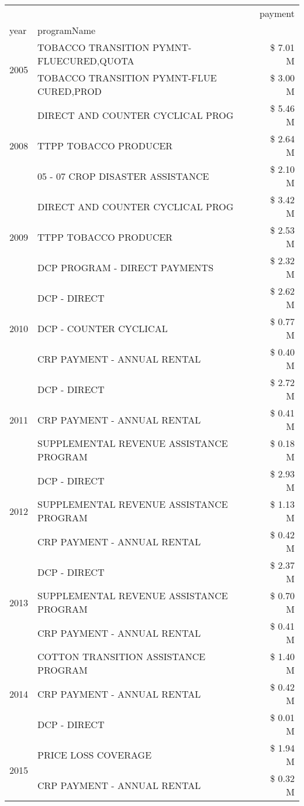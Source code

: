 \begin{tabular}{llr}
\toprule
 &  & payment \\
year & programName &  \\
\midrule
\multirow[t]{2}{*}{2005} & TOBACCO TRANSITION PYMNT-FLUECURED,QUOTA & \$ 7.01 M \\
 & TOBACCO TRANSITION PYMNT-FLUE CURED,PROD & \$ 3.00 M \\
\cline{1-3}
\multirow[t]{3}{*}{2008} & DIRECT AND COUNTER CYCLICAL PROG & \$ 5.46 M \\
 & TTPP TOBACCO PRODUCER & \$ 2.64 M \\
 & 05 - 07 CROP DISASTER ASSISTANCE & \$ 2.10 M \\
\cline{1-3}
\multirow[t]{3}{*}{2009} & DIRECT AND COUNTER CYCLICAL PROG & \$ 3.42 M \\
 & TTPP TOBACCO PRODUCER & \$ 2.53 M \\
 & DCP PROGRAM - DIRECT PAYMENTS & \$ 2.32 M \\
\cline{1-3}
\multirow[t]{3}{*}{2010} & DCP - DIRECT & \$ 2.62 M \\
 & DCP - COUNTER CYCLICAL & \$ 0.77 M \\
 & CRP PAYMENT - ANNUAL RENTAL & \$ 0.40 M \\
\cline{1-3}
\multirow[t]{3}{*}{2011} & DCP - DIRECT & \$ 2.72 M \\
 & CRP PAYMENT - ANNUAL RENTAL & \$ 0.41 M \\
 & SUPPLEMENTAL REVENUE ASSISTANCE PROGRAM & \$ 0.18 M \\
\cline{1-3}
\multirow[t]{3}{*}{2012} & DCP - DIRECT & \$ 2.93 M \\
 & SUPPLEMENTAL REVENUE ASSISTANCE PROGRAM & \$ 1.13 M \\
 & CRP PAYMENT - ANNUAL RENTAL & \$ 0.42 M \\
\cline{1-3}
\multirow[t]{3}{*}{2013} & DCP - DIRECT & \$ 2.37 M \\
 & SUPPLEMENTAL REVENUE ASSISTANCE PROGRAM & \$ 0.70 M \\
 & CRP PAYMENT - ANNUAL RENTAL & \$ 0.41 M \\
\cline{1-3}
\multirow[t]{3}{*}{2014} & COTTON TRANSITION ASSISTANCE PROGRAM & \$ 1.40 M \\
 & CRP PAYMENT - ANNUAL RENTAL & \$ 0.42 M \\
 & DCP - DIRECT & \$ 0.01 M \\
\cline{1-3}
\multirow[t]{3}{*}{2015} & PRICE LOSS COVERAGE & \$ 1.94 M \\
 & CRP PAYMENT - ANNUAL RENTAL & \$ 0.32 M \\

\end{tabular}
